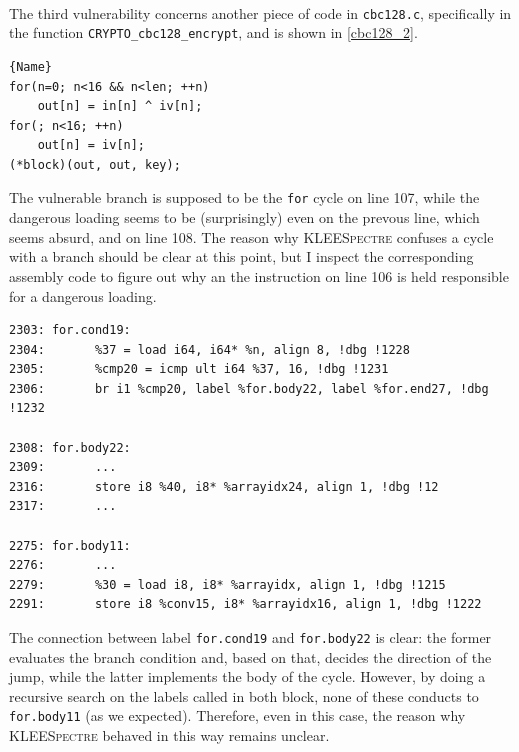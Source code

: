\documentclass[12pt,a4paper]{book}
\theoremstyle{definition}
\begin{document}
	\paragraph{}The third vulnerability concerns another piece of code in \texttt{cbc128.c}, specifically in the function \texttt{CRYPTO\_cbc128\_encrypt}, and is shown in \ref{cbc128_2}.
	
	\begin{minipage}{.45\textwidth}
		\begin{lstlisting}[caption=\texttt{cbc128.c}, firstnumber=105, label=cbc128_2]{Name}
for(n=0; n<16 && n<len; ++n)
	out[n] = in[n] ^ iv[n];
for(; n<16; ++n)
	out[n] = iv[n];
(*block)(out, out, key);
		\end{lstlisting}
	\end{minipage}
	\vspace{3mm}
	
	The vulnerable branch is supposed to be the \texttt{for} cycle on line 107, while the dangerous loading seems to be (surprisingly) even on the prevous line, which seems absurd, and on line 108. The reason why \textsc{KLEESpectre} confuses a cycle with a branch should be clear at this point, but I inspect the corresponding assembly code to figure out why an the instruction on line 106 is held responsible for a dangerous loading.
	
	\lstset{
		numbers=none
	}
	\begin{lstlisting}[caption=\texttt{assembly.ll}]
2303: for.cond19:                
2304: 		%37 = load i64, i64* %n, align 8, !dbg !1228
2305:		%cmp20 = icmp ult i64 %37, 16, !dbg !1231                       
2306: 		br i1 %cmp20, label %for.body22, label %for.end27, !dbg !1232

2308: for.body22: 
2309:		...
2316:		store i8 %40, i8* %arrayidx24, align 1, !dbg !12
2317:		...

2275: for.body11: 
2276:		...
2279: 		%30 = load i8, i8* %arrayidx, align 1, !dbg !1215
2291: 		store i8 %conv15, i8* %arrayidx16, align 1, !dbg !1222
	\end{lstlisting}
	\vspace{3mm}
	
	The connection between label \texttt{for.cond19} and \texttt{for.body22} is clear: the former evaluates the branch condition and, based on that, decides the direction of the jump, while the latter implements the body of the cycle. However, by doing a recursive search on the labels called in both block, none of these conducts to \texttt{for.body11} (as we expected). Therefore, even in this case, the reason why \textsc{KLEESpectre} behaved in this way remains unclear.
	
\end{document}
